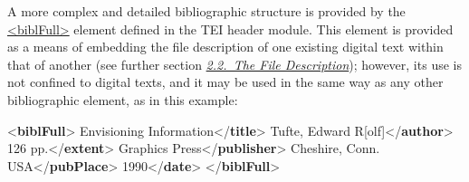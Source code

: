 A more complex and detailed bibliographic structure is provided by the \hyperref[TEI.biblFull]{<biblFull>} element defined in the TEI header module. This element is provided as a means of embedding the file description of one existing digital text within that of another (see further section \textit{\hyperref[HD2]{2.2.\ The File Description}}); however, its use is not confined to digital texts, and it may be used in the same way as any other bibliographic element, as in this example: \par\bgroup{}\exampleFont \begin{shaded}\noindent\mbox{}{<\textbf{biblFull}>}\mbox{}\newline 
{}\mbox{}\newline 
\hspace*{1em}Envisioning Information{</\textbf{title}>}\mbox{}\newline 
\hspace*{1em}Tufte, Edward R[olf]{</\textbf{author}>}\mbox{}\newline 
{}\mbox{}\newline 
{}126 pp.{</\textbf{extent}>}\mbox{}\newline 
{}\mbox{}\newline 
\hspace*{1em}Graphics Press{</\textbf{publisher}>}\mbox{}\newline 
\hspace*{1em}Cheshire, Conn. USA{</\textbf{pubPlace}>}\mbox{}\newline 
\hspace*{1em}1990{</\textbf{date}>}\mbox{}\newline 
{}\mbox{}\newline 
{</\textbf{biblFull}>}\end{shaded}\egroup\par \par
